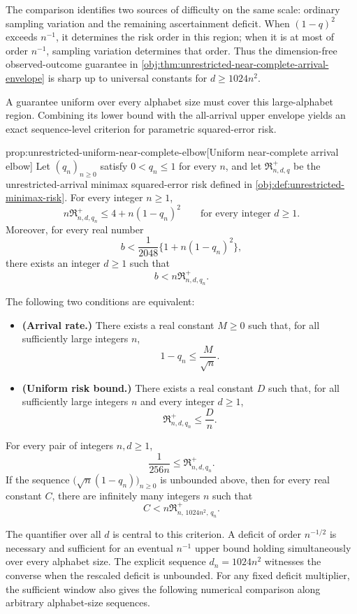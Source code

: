 The comparison identifies two sources of difficulty on the same scale: ordinary sampling variation and the remaining ascertainment deficit. When \((1-q)^2\) exceeds \(n^{-1}\), it determines the risk order in this region; when it is at most of order \(n^{-1}\), sampling variation determines that order. Thus the dimension-free observed-outcome guarantee in \cref{obj:thm:unrestricted-near-complete-arrival-envelope} is sharp up to universal constants for \(d\ge1024n^2\).

A guarantee uniform over every alphabet size must cover this large-alphabet region. Combining its lower bound with the all-arrival upper envelope yields an exact sequence-level criterion for parametric squared-error risk.

\begin{propositionv}{prop:unrestricted-uniform-near-complete-elbow}[Uniform near-complete arrival elbow]
Let \((q_n)_{n\ge0}\) satisfy \(0<q_n\le1\) for every \(n\), and let \(\mathfrak R^{+}_{n,d,q}\) be the unrestricted-arrival minimax squared-error risk defined in \cref{obj:def:unrestricted-minimax-risk}. For every integer \(n\ge1\),
\[
n\mathfrak R^{+}_{n,d,q_n}\le 4+n(1-q_n)^2
\qquad\text{for every integer }d\ge1.
\]
Moreover, for every real number
\[
b<\frac{1}{2048}\bigl\{1+n(1-q_n)^2\bigr\},
\]
there exists an integer \(d\ge1\) such that
\[
b<n\mathfrak R^{+}_{n,d,q_n}.
\]

The following two conditions are equivalent:
\begin{itemize}
\item \textbf{(Arrival rate.)} There exists a real constant \(M\ge0\) such that, for all sufficiently large integers \(n\),
\[
1-q_n\le \frac{M}{\sqrt n}.
\]
\item \textbf{(Uniform risk bound.)} There exists a real constant \(D\) such that, for all sufficiently large integers \(n\) and every integer \(d\ge1\),
\[
\mathfrak R^{+}_{n,d,q_n}\le \frac{D}{n}.
\]
\end{itemize}

For every pair of integers \(n,d\ge1\),
\[
\frac{1}{256n}\le \mathfrak R^{+}_{n,d,q_n}.
\]
If the sequence \(\bigl(\sqrt n(1-q_n)\bigr)_{n\ge0}\) is unbounded above, then for every real constant \(C\), there are infinitely many integers \(n\) such that
\[
C<n\mathfrak R^{+}_{n,\,1024n^2,\,q_n}.
\]
\end{propositionv}

The quantifier over all \(d\) is central to this criterion. A deficit of order \(n^{-1/2}\) is necessary and sufficient for an eventual \(n^{-1}\) upper bound holding simultaneously over every alphabet size. The explicit sequence \(d_n=1024n^2\) witnesses the converse when the rescaled deficit is unbounded. For any fixed deficit multiplier, the sufficient window also gives the following numerical comparison along arbitrary alphabet-size sequences.

